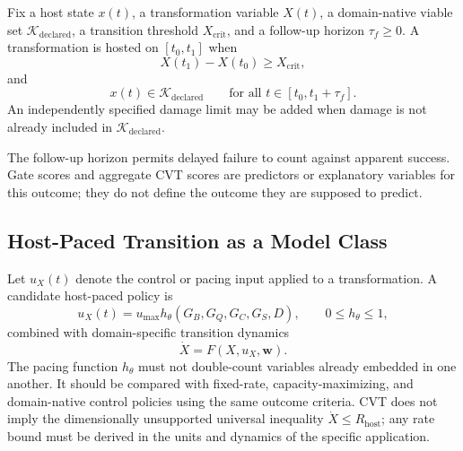 \begin{definition}
Fix a host state \(x(t)\), a transformation variable \(X(t)\), a domain-native viable set \(\mathcal K_{\mathrm{declared}}\), a transition threshold \(X_{\mathrm{crit}}\), and a follow-up horizon \(\tau_f\geq0\). A transformation is hosted on \([t_0,t_1]\) when
\begin{equation}
    X(t_1)-X(t_0)
    \geq
    X_{\mathrm{crit}},
    \label{eq:transformation-success}
\end{equation}
and
\begin{equation}
    x(t)\in\mathcal K_{\mathrm{declared}}
    \qquad
    \text{for all }t\in[t_0,t_1+\tau_f].
    \label{eq:delayed-host-viability}
\end{equation}
An independently specified damage limit may be added when damage is not already included in \(\mathcal K_{\mathrm{declared}}\).
\end{definition}

The follow-up horizon permits delayed failure to count against apparent success. Gate scores and aggregate CVT scores are predictors or explanatory variables for this outcome; they do not define the outcome they are supposed to predict.

\subsection{Host-Paced Transition as a Model Class}

Let \(u_X(t)\) denote the control or pacing input applied to a transformation. A candidate host-paced policy is
\begin{equation}
    u_X(t)
    =
    u_{\max}
    h_{\theta}\!\left(
        G_B,G_Q,G_C,G_S,D
    \right),
    \qquad
    0\leq h_{\theta}\leq1,
    \label{eq:host-capacity-policy}
\end{equation}
combined with domain-specific transition dynamics
\begin{equation}
    \dot X
    =
    F\!\left(X,u_X,\mathbf w\right).
    \label{eq:host-gated-transition}
\end{equation}
The pacing function \(h_{\theta}\) must not double-count variables already embedded in one another. It should be compared with fixed-rate, capacity-maximizing, and domain-native control policies using the same outcome criteria. CVT does not imply the dimensionally unsupported universal inequality \(\dot X\leq R_{\mathrm{host}}\); any rate bound must be derived in the units and dynamics of the specific application.

